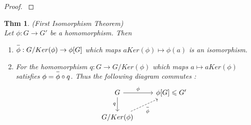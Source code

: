 \documentclass[paper=a4, fontsize=11pt]{scrartcl}
\newcommand{\nextline}{$ $ \newline \vspace{-0.15in}}
\newcommand{\overbar}[1]{
	\mkern 1.5mu \overline{\mkern-1.5mu\raisebox{0pt}[\dimexpr\height+0.5mm\relax]{$#1$}\mkern-1.5mu}\mkern 1.5mu
}
\newtheorem{theorem}{Thm}
\begin{document}
\begin{proof}
\nextline
{}
\end{proof}

\vspace{0.15in}

\begin{theorem}(First Isomorphism Theorem)\\[0.15in]
	Let $\phi:G \to G'$ be a homomorphism. Then 
	\begin{enumerate}[label=\arabic*)]
		\item $\overbar{\phi} : G/Ker(\phi) \to \phi[G]$ which maps $aKer(\phi) \mapsto \phi(a)$ is an isomorphism.
		\item For the homomorphism $q: G \to G/Ker(\phi)$ which maps $a \mapsto aKer(\phi)$ satisfies $\phi = \overbar{\phi}\circ q$. Thus the following diagram commutes : 
		\vspace{0.15in}
		\[
		\begin{tikzcd}	
		& G \arrow{d}[swap]{q} \arrow[r,"\phi"] & \phi[G] \leqslant G' \\
		& G/Ker(\phi) \arrow[dashrightarrow]{ru}[swap]{\overbar{\phi}}
		\end{tikzcd}	
		\]
	\end{enumerate}
\end{theorem}
\end{document}
